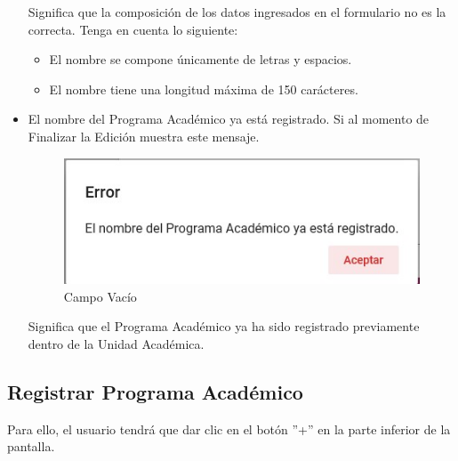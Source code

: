 \begin{itemize}
                	Significa que la composición de los datos ingresados en el formulario no es la correcta. Tenga en cuenta lo siguiente:

                	\begin{itemize}
                		\item El nombre se compone únicamente de letras y espacios.

                        \item El nombre tiene una longitud máxima de 150 carácteres.
                	\end{itemize}

                \item El nombre del Programa Académico ya está registrado.
                    Si al momento de Finalizar la Edición muestra este mensaje.

                     \begin{figure}[H]
                    \centering
                    \hypertarget{vacio}{\includegraphics[width=0.7\linewidth]{images/SP3/Yareg}}
                    \caption{Campo Vacío}
                    \label{vacio}
                    \end{figure}

                    Significa que el Programa Académico ya ha sido registrado previamente dentro de la Unidad Académica.



            \end{itemize}
        \subsection{Registrar Programa Académico}

            Para ello, el usuario tendrá que dar clic en el botón ''+'' en la parte inferior de la pantalla.

